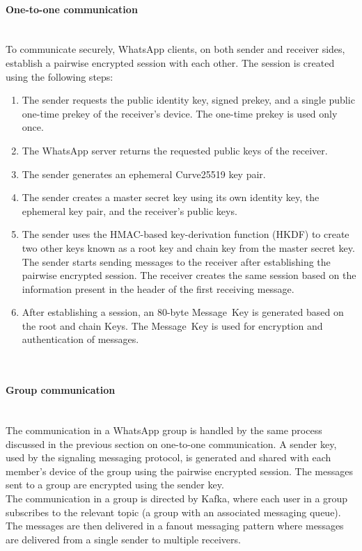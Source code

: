 \paragraph{One-to-one communication}\label{one-to-one-communication}
\\
To communicate securely, WhatsApp clients, on both sender and receiver sides, establish a pairwise encrypted session with each other. The session is created using the following steps:

\begin{enumerate}
\def\labelenumi{\arabic{enumi}.}
\item
The sender requests the public identity key, signed prekey, and a single public one-time prekey of the receiver's device. The one-time prekey is used only once.
\item
The WhatsApp server returns the requested public keys of the receiver.
\item
The sender generates an ephemeral Curve25519 key pair.
\item
The sender creates a master secret key using its own identity key, the ephemeral key pair, and the receiver's public keys.
\item
The sender uses the HMAC-based key-derivation function (HKDF) to create two other keys known as a root key and chain key from the master secret key. The sender starts sending messages to the receiver after establishing the pairwise encrypted session. The receiver creates the same session based on the information present in the header of the first receiving message.
\item
After establishing a session, an 80-byte Message\ Key is generated based on the root and chain Keys. The Message\ Key is used for encryption and authentication of messages.
\end{enumerate}
\\
\paragraph{Group communication}\label{group-communication}
\\
The communication in a WhatsApp group is handled by the same process discussed in the previous section on one-to-one communication. A sender key, used by the signaling messaging protocol, is generated and shared with each member's device of the group using the pairwise encrypted session. The messages sent to a group are encrypted using the sender key.
\\
The communication in a group is directed by Kafka, where each user in a group subscribes to the relevant topic (a group with an associated messaging queue). The messages are then delivered in a fanout messaging pattern where messages are delivered from a single sender to multiple receivers.

